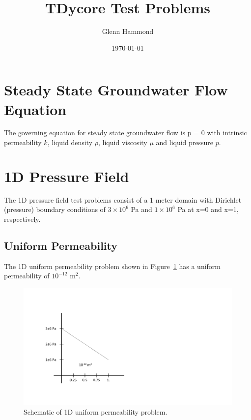 \documentclass{article}
\title{TDycore Test Problems}
\author{Glenn Hammond}
\date{\today}
\def\EQ#1\EN{\begin{equation}#1\end{equation}}
\begin{document}
\maketitle

\section{Steady State Groundwater Flow Equation}
The governing equation for steady state groundwater flow is
\EQ
\nabla \cdot {} \nabla p = 0
\EN
with intrinsic permeability $k$, liquid density $\rho$, liquid viscosity $\mu$ and liquid pressure $p$.

\newpage
\section{1D Pressure Field}
The 1D pressure field test problems consist of a 1 meter domain with Dirichlet (pressure) boundary conditions of $3\times 10^{6}$ Pa and $1\times 10^{6}$ Pa at x=0 and x=1, respectively. 

\subsection{Uniform Permeability}
The 1D uniform permeability problem shown in Figure~\ref{fig:1d_uniform} has a uniform permeability of $10^{-12}$ m$^2$.
\begin{figure}[htbp]
  \centering
  \includegraphics[width=0.8\linewidth]{figs/1d_uniform}
  \caption{Schematic of 1D uniform permeability problem.}
  \label{fig:1d_uniform}
\end{figure}

\newpage
\end{document}
